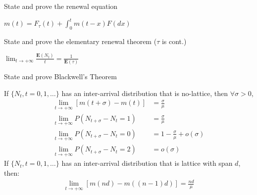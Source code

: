 \documentclass[11pt]{article}
\newcommand{\expect}[1]{\mathbf{E}(#1)}
\newcommand*{\xfield}[1]{\begin{mdframed}\centering #1\end{mdframed}\bigskip}
\newenvironment{field}{}{}
\newenvironment{note}{}{}
\begin{document}
%
\begin{note}
  \xfield{State and prove the renewal equation}
  \begin{field}
    \(m(t) = F_\tau(t) + \int_0^t m(t-x) F(dx)\)
  \end{field}
\end{note}
%
\begin{note}
  \xfield{State and prove the elementary renewal theorem (\(\tau\) is cont.)}
  \begin{field}
    \(\displaystyle \lim_{t \to +\infty} \frac{\expect{N_t}}{t} =
    \frac{1}{\expect{\tau}}\)
  \end{field}
\end{note}
%
\begin{note}
  \xfield{State and prove Blackwell's Theorem}
  \begin{field}
    If \(\{N_t, t = 0,1,\ldots\}\) has an inter-arrival distribution
    that is no-lattice, then \(\forall \sigma > 0\),
    \begin{align*}
      \lim_{t \to +\infty} [ m(t+\sigma) - m(t) ]
      & = \frac{\sigma}{\mu} \\
      \lim_{t \to +\infty} P(N_{t + \sigma} - N_t = 1)
      & = \frac{\sigma}{\mu} \\
      \lim_{t \to +\infty} P(N_{t+\sigma} - N_t = 0)
      & = 1 - \frac{\sigma}{\mu} + o(\sigma) \\
      \lim_{t \to +\infty} P(N_{t+\sigma} - N_t = 2)
      & = o(\sigma)
    \end{align*}
    If \(\{N_t, t = 0,1,\ldots\}\) has an inter-arrival distribution
    that is lattice with span \(d\), then:
    \begin{align*}
      \lim_{t \to +\infty} [ m(nd) - m((n-1)d)] = \frac{nd}{\mu}
    \end{align*}
  \end{field}
\end{note}
%
\end{document}
